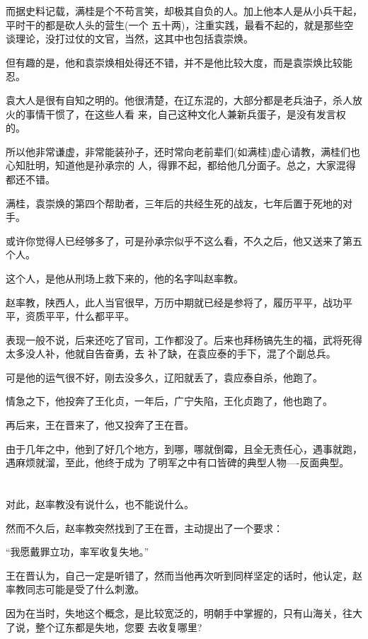 \documentclass[11pt,a4paper,onecolumn]{article}
\begin{document}
而据史料记载，满桂是个不苟言笑，却极其自负的人。加上他本人是从小兵干起，平时干的都是砍人头的营生(一个
五十两)，注重实践，最看不起的，就是那些空谈理论，没打过仗的文官，当然，这其中也包括袁崇焕。

但有趣的是，他和袁崇焕相处得还不错，并不是他比较大度，而是袁崇焕比较能忍。

袁大人是很有自知之明的。他很清楚，在辽东混的，大部分都是老兵油子，杀人放火的事情干惯了，在这些人看
来，自己这种文化人兼新兵蛋子，是没有发言权的。

所以他非常谦虚，非常能装孙子，还时常向老前辈们(如满桂)虚心请教，满桂们也心知肚明，知道他是孙承宗的
人，得罪不起，都给他几分面子。总之，大家混得都还不错。

满桂，袁崇焕的第四个帮助者，三年后的共经生死的战友，七年后置于死地的对手。

或许你觉得人已经够多了，可是孙承宗似乎不这么看，不久之后，他又送来了第五个人。

这个人，是他从刑场上救下来的，他的名字叫赵率教。

赵率教，陕西人，此人当官很早，万历中期就已经是参将了，履历平平，战功平平，资质平平，什么都平平。

表现一般不说，后来还吃了官司，工作都没了。后来也拜杨镐先生的福，武将死得太多没人补，他就自告奋勇，去
补了缺，在袁应泰的手下，混了个副总兵。

可是他的运气很不好，刚去没多久，辽阳就丢了，袁应泰自杀，他跑了。

情急之下，他投奔了王化贞，一年后，广宁失陷，王化贞跑了，他也跑了。

再后来，王在晋来了，他又投奔了王在晋。

由于几年之中，他到了好几个地方，到哪，哪就倒霉，且全无责任心，遇事就跑，遇麻烦就溜，至此，他终于成为
了明军之中有口皆碑的典型人物----反面典型。

\section[\thesection]{}

对此，赵率教没有说什么，也不能说什么。

然而不久后，赵率教突然找到了王在晋，主动提出了一个要求：

``我愿戴罪立功，率军收复失地。''

王在晋认为，自己一定是听错了，然而当他再次听到同样坚定的话时，他认定，赵率教同志可能是受了什么刺激。

因为在当时，失地这个概念，是比较宽泛的，明朝手中掌握的，只有山海关，往大了说，整个辽东都是失地，您要
去收复哪里?
\end{document}
